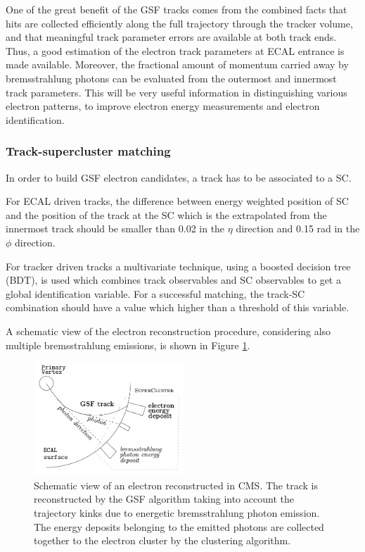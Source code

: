 One of the great benefit of the GSF tracks comes from the combined facts that hits are collected efficiently along the full trajectory through the tracker volume, and that meaningful track parameter errors are available at both track ends. Thus, a good estimation of the electron track parameters at ECAL entrance is made available.
Moreover, the fractional amount of momentum carried away by bremsstrahlung photons can be evaluated from the outermost and innermost track parameters. This will be very useful information in distinguishing various electron patterns, to improve electron energy measurements and electron identification.


\subsubsection{Track-supercluster matching}\label{subsec:track_sc_matching}

In order to build GSF electron candidates, a track has to be associated to a SC.

For ECAL driven tracks, the difference between energy weighted position of SC and the position of the track at the SC which is the extrapolated from the innermost track should be smaller than 0.02 in the $\eta$ direction and 0.15 rad in the $\phi$ direction.

For tracker driven tracks a multivariate technique, using a boosted decision tree (BDT), is used which combines track observables and SC observables to get a global identification variable. For a successful matching, the track-SC combination should have a value which higher than a threshold of this variable.

\medskip
A schematic view of the electron reconstruction procedure, considering also multiple bremsstrahlung emissions, is shown in Figure \ref{fig:ele_reco}.
\begin{figure}[!htb]
  \begin{center}
    \includegraphics[width=0.5\textwidth]{figures/Reconstruction/Electron_photon/electron_reco_scheme.png}
    \caption{Schematic view of an electron reconstructed in CMS. The track is reconstructed by the GSF algorithm taking into account the trajectory kinks due to energetic bremsstrahlung photon emission. The energy deposits belonging to the emitted photons are collected together to the electron cluster by the clustering algorithm.\label{fig:ele_reco}}
  \end{center}
\end{figure}

